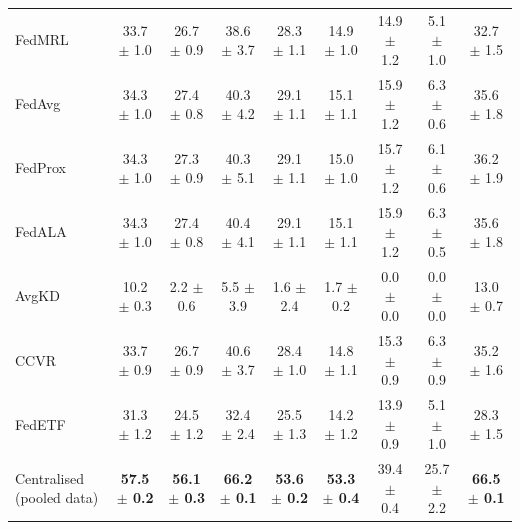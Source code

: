 \begin{tabular}{lcccccccc}
FedMRL & 33.7 $\pm$ 1.0 & 26.7 $\pm$ 0.9 & 38.6 $\pm$ 3.7 & 28.3 $\pm$ 1.1 & 14.9 $\pm$ 1.0 & 14.9 $\pm$ 1.2 & 5.1 $\pm$ 1.0 & 32.7 $\pm$ 1.5\\
FedAvg & 34.3 $\pm$ 1.0 & 27.4 $\pm$ 0.8 & 40.3 $\pm$ 4.2 & 29.1 $\pm$ 1.1 & 15.1 $\pm$ 1.1 & 15.9 $\pm$ 1.2 & 6.3 $\pm$ 0.6 & 35.6 $\pm$ 1.8\\
FedProx & 34.3 $\pm$ 1.0 & 27.3 $\pm$ 0.9 & 40.3 $\pm$ 5.1 & 29.1 $\pm$ 1.1 & 15.0 $\pm$ 1.0 & 15.7 $\pm$ 1.2 & 6.1 $\pm$ 0.6 & 36.2 $\pm$ 1.9\\
FedALA & 34.3 $\pm$ 1.0 & 27.4 $\pm$ 0.8 & 40.4 $\pm$ 4.1 & 29.1 $\pm$ 1.1 & 15.1 $\pm$ 1.1 & 15.9 $\pm$ 1.2 & 6.3 $\pm$ 0.5 & 35.6 $\pm$ 1.8\\
AvgKD & 10.2 $\pm$ 0.3 & 2.2 $\pm$ 0.6 & 5.5 $\pm$ 3.9 & 1.6 $\pm$ 2.4 & 1.7 $\pm$ 0.2 & 0.0 $\pm$ 0.0 & 0.0 $\pm$ 0.0 & 13.0 $\pm$ 0.7\\
CCVR & 33.7 $\pm$ 0.9 & 26.7 $\pm$ 0.9 & 40.6 $\pm$ 3.7 & 28.4 $\pm$ 1.0 & 14.8 $\pm$ 1.1 & 15.3 $\pm$ 0.9 & 6.3 $\pm$ 0.9 & 35.2 $\pm$ 1.6\\
FedETF & 31.3 $\pm$ 1.2 & 24.5 $\pm$ 1.2 & 32.4 $\pm$ 2.4 & 25.5 $\pm$ 1.3 & 14.2 $\pm$ 1.2 & 13.9 $\pm$ 0.9 & 5.1 $\pm$ 1.0 & 28.3 $\pm$ 1.5\\
Centralised (pooled data) & \textbf{57.5 $\pm$ 0.2} & \textbf{56.1 $\pm$ 0.3} & \textbf{66.2 $\pm$ 0.1} & \textbf{53.6 $\pm$ 0.2} & \textbf{53.3 $\pm$ 0.4} & 39.4 $\pm$ 0.4 & 25.7 $\pm$ 2.2 & \textbf{66.5 $\pm$ 0.1}\\
\bottomrule
\end{tabular}
